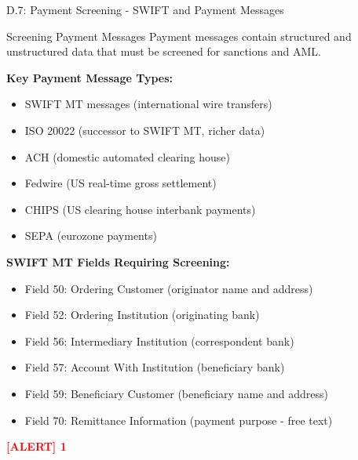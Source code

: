 \documentclass[11pt,a4paper]{beamer}
\newcommand{\redflag}[1]{\textcolor{red}{\textbf{[ALERT] 1}}}
\begin{document}
\begin{frame}{D.7: Payment Screening - SWIFT and Payment Messages}
	\begin{block}{Screening Payment Messages}
		Payment messages contain structured and unstructured data that must be screened for sanctions and AML.
	\end{block}
	\textbf{Key Payment Message Types:}
	\begin{itemize}
		\item SWIFT MT messages (international wire transfers)
		\item ISO 20022 (successor to SWIFT MT, richer data)
		\item ACH (domestic automated clearing house)
		\item Fedwire (US real-time gross settlement)
		\item CHIPS (US clearing house interbank payments)
		\item SEPA (eurozone payments)
	\end{itemize}
	\textbf{SWIFT MT Fields Requiring Screening:}
	\begin{itemize}
		\item Field 50: Ordering Customer (originator name and address)
		\item Field 52: Ordering Institution (originating bank)
		\item Field 56: Intermediary Institution (correspondent bank)
		\item Field 57: Account With Institution (beneficiary bank)
		\item Field 59: Beneficiary Customer (beneficiary name and address)
		\item Field 70: Remittance Information (payment purpose - free text)
	\end{itemize}
	\redflag{Free text fields (Field 70) are often used to evade screening with misspellings or coded language.}
\end{frame}
\end{document}

